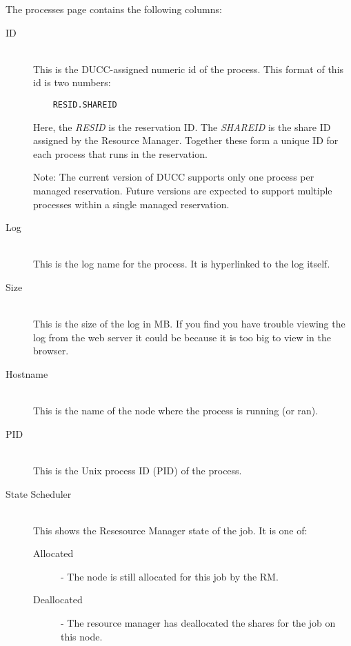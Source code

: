    The processes page contains the following columns:
   \begin{description}
      \item[ID] \hfill \\
        This is the DUCC-assigned numeric id of the process.  This format of this
        id is two numbers:
\begin{verbatim}
    RESID.SHAREID
\end{verbatim}
        Here, the {\em RESID} is the reservation ID.  The {\em SHAREID} is the 
        share ID assigned by the Resource Manager.  Together these form a unique
        ID for each process that runs in the reservation.
        
        Note: The current version of DUCC supports only one process per managed
        reservation.  Future versions are expected to support multiple processes
        within a single managed reservation.
        
      \item[Log] \hfill \\
        This is the log name for the process. It is hyperlinked to the log itself.
        
      \item[Size] \hfill \\
        This is the size of the log in MB. If you find you have trouble viewing the log
        from the web server it could be because it is too big to view in the browser.
        
      \item[Hostname] \hfill \\
        This is the name of the node where the process is running (or ran).
        
      \item[PID] \hfill \\
        This is the Unix process ID (PID) of the process.
        
      \item[State Scheduler] \hfill \\
        This shows the Resesource Manager state of the job. It is one of:
        
        \begin{description}
            \item[Allocated] - The node is still allocated for this job by the RM.
            \item[Deallocated] - The resource manager has deallocated the shares for the job on
              this node.
        \end{description}
        

\end{description}
